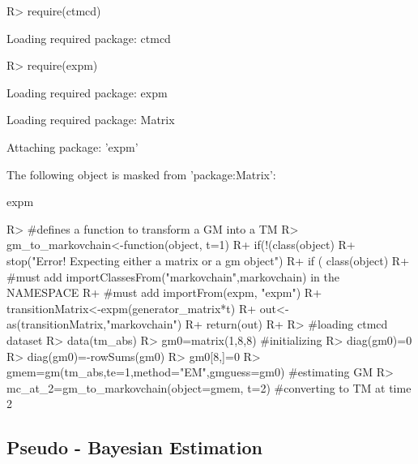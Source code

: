 \documentclass[article,nojss]{jss}
\begin{document}
\begin{CodeChunk}

\begin{CodeInput}
R> require(ctmcd)
\end{CodeInput}

\begin{CodeOutput}
Loading required package: ctmcd
\end{CodeOutput}

\begin{CodeInput}
R> require(expm)
\end{CodeInput}

\begin{CodeOutput}
Loading required package: expm
\end{CodeOutput}

\begin{CodeOutput}
Loading required package: Matrix
\end{CodeOutput}

\begin{CodeOutput}

Attaching package: 'expm'
\end{CodeOutput}

\begin{CodeOutput}
The following object is masked from 'package:Matrix':

    expm
\end{CodeOutput}

\begin{CodeInput}
R> #defines a function to transform a GM into a TM
R> gm_to_markovchain<-function(object, t=1) {
R+   if(!(class(object) %
R+     stop("Error! Expecting either a matrix or a gm object")
R+   if ( class(object) %
R+   #must add importClassesFrom("markovchain",markovchain) in the NAMESPACE
R+   #must add importFrom(expm, "expm")
R+   transitionMatrix<-expm(generator_matrix*t)
R+   out<-as(transitionMatrix,"markovchain")
R+   return(out)
R+ }
R> #loading ctmcd dataset
R> data(tm_abs)
R> gm0=matrix(1,8,8) #initializing
R> diag(gm0)=0
R> diag(gm0)=-rowSums(gm0)
R> gm0[8,]=0
R> gmem=gm(tm_abs,te=1,method="EM",gmguess=gm0) #estimating GM
R> mc_at_2=gm_to_markovchain(object=gmem, t=2) #converting to TM at time 2
\end{CodeInput}
\end{CodeChunk}

\hypertarget{pseudo---bayesian-estimation}{%
\subsection{Pseudo - Bayesian Estimation}\label{pseudo---bayesian-estimation}}
\end{document}
